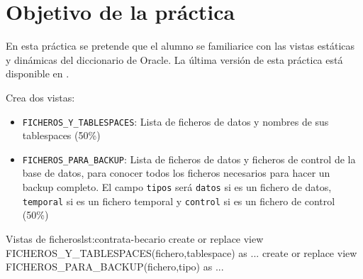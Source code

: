 
\usepackage{needspace}




\renewcommand{\hmwkTitle}{Vistas estáticas y dinámicas}
\renewcommand{\hmwkClass}{Administración y Gestión de Bases de datos}







\primerapagina


\section{Objetivo de la práctica} 
En esta práctica se pretende que el alumno se familiarice con las vistas estáticas y dinámicas del diccionario de Oracle.
La última versión de esta práctica está disponible en .


\begin{homeworkProblem}
  Crea dos vistas:
  \begin{itemize}
  \item \texttt{FICHEROS\_Y\_TABLESPACES}: Lista de ficheros de datos y nombres de sus tablespaces (50\%)
  \item \texttt{FICHEROS\_PARA\_BACKUP}: Lista de ficheros de datos y ficheros de control de la base de datos, para conocer todos los ficheros necesarios para hacer un backup completo. El campo \texttt{tipos} será \texttt{datos} si es un fichero de datos, \texttt{temporal} si es un fichero temporal y \texttt{control} si es un fichero de control (50\%)
  \end{itemize}

\begin{listadosql}{Vistas de ficheros}{lst:contrata-becario}
create or replace view FICHEROS_Y_TABLESPACES(fichero,tablespace) as ...
create or replace view FICHEROS_PARA_BACKUP(fichero,tipo) as ...
\end{listadosql}
  
\end{homeworkProblem}

